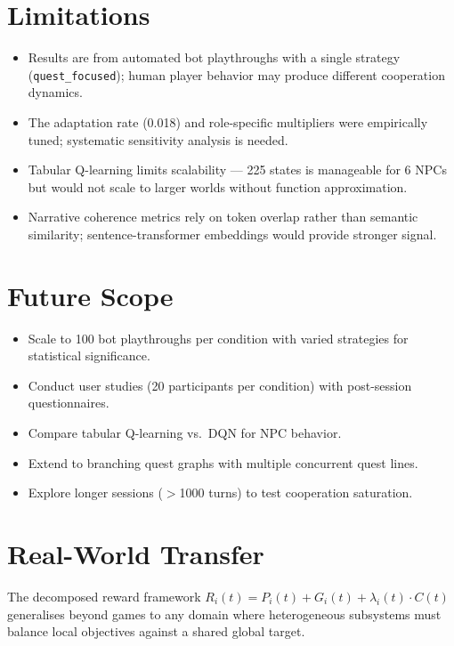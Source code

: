 \documentclass[12pt, a4paper, oneside]{report}
\begin{document}
\section{Limitations}
\label{sec:limitations}

\begin{itemize}[nosep]
    \item Results are from automated bot playthroughs with a single strategy (\texttt{quest\_focused}); human player behavior may produce different cooperation dynamics.
    \item The adaptation rate (0.018) and role-specific multipliers were empirically tuned; systematic sensitivity analysis is needed.
    \item Tabular Q-learning limits scalability --- 225 states is manageable for 6 NPCs but would not scale to larger worlds without function approximation.
    \item Narrative coherence metrics rely on token overlap rather than semantic similarity; sentence-transformer embeddings would provide stronger signal.
\end{itemize}

\section{Future Scope}
\label{sec:future-scope}

\begin{itemize}[nosep]
    \item Scale to 100 bot playthroughs per condition with varied strategies for statistical significance.
    \item Conduct user studies (20 participants per condition) with post-session questionnaires.
    \item Compare tabular Q-learning vs.\ DQN for NPC behavior.
    \item Extend to branching quest graphs with multiple concurrent quest lines.
    \item Explore longer sessions ($>$1000 turns) to test cooperation saturation.
\end{itemize}

\section{Real-World Transfer}
\label{sec:real-world-transfer}

The decomposed reward framework $R_i(t) = P_i(t) + G_i(t) + \lambda_i(t) \cdot C(t)$ generalises beyond games to any domain where heterogeneous subsystems must balance local objectives against a shared global target.
\end{document}
